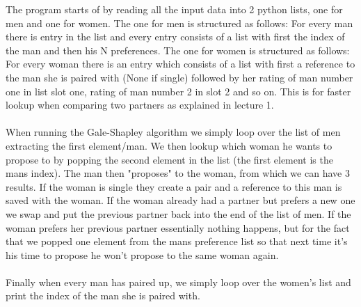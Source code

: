 \documentclass{article}
\begin{document}
  The program starts of by reading all the input data into 2 python lists, one for men and one for women. The one for men is structured as follows: For every man there is entry in the list and every entry consists of a list with first the index of the man and then his N preferences. The one for women is structured as follows: For every woman there is an entry which consists of a list with first a reference to the man she is paired with (None if single) followed by her rating of man number one in list slot one, rating of man number 2 in slot 2 and so on. This is for faster lookup when comparing two partners as explained in lecture 1. 
  \\\\
  When running the Gale-Shapley algorithm we simply loop over the list of men extracting the first element/man. We then lookup which woman he wants to propose to by popping the second element in the list (the first element is the mans index). The man then "proposes" to the woman, from which we can have 3 results. If the woman is single they create a pair and a reference to this man is saved with the woman. If the woman already had a partner but prefers a new one we swap and put the previous partner back into the end of the list of men. If the woman prefers her previous partner essentially nothing happens, but for the fact that we popped one element from the mans preference list so that next time it's his time to propose he won't propose to the same woman again.
  \\\\
  Finally when every man has paired up, we simply loop over the women's list and print the index of the man she is paired with.
\end{document}
